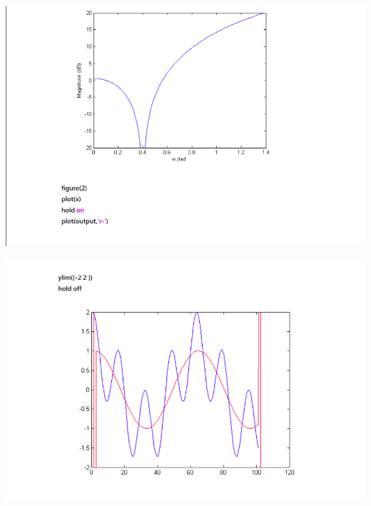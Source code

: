 \documentclass[a4paper]{article}
\begin{document}
	
	
	\begin{center}
		\includegraphics[width=1\linewidth]{screenshot114}
	\end{center}
	
	
	\begin{center}
		\includegraphics[width=1\linewidth]{screenshot115}
	\end{center}
	
	
\newpage

\end{document}
